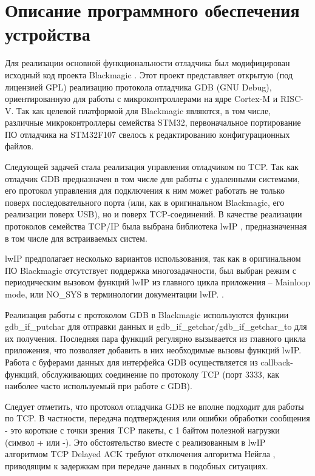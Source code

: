 \chapter{Описание программного обеспечения устройства}
\hspace{1cm} 

Для реализации основной функциональности отладчика был модифицирован исходный код проекта 
Blackmagic \cite{BlackMagic}. Этот проект представляет открытую (под лицензией GPL) реализацию протокола 
отладчика GDB (GNU Debug), ориентированную для работы с микроконтроллерами на ядре Cortex-M и RISC-V. 
Так как целевой платформой для Blackmagic являются, в том числе, различные микроконтроллеры 
семейства STM32, первоначальное портирование ПО отладчика на STM32F107 свелось к редактированию 
конфигурационных файлов.

Следующей задачей стала реализация управления отладчиком по TCP. Так как отладчик GDB предназначен 
в том числе для работы с удаленными системами, его протокол управления для подключения к ним может
работать не только поверх последовательного порта (или, как в оригинальном Blackmagic, его реализации
поверх USB), но и поверх TCP-соединений. В качестве реализации протоколов семейства TCP/IP была 
выбрана библиотека lwIP \cite{LWIP:doc}, предназначенная в том числе для встраиваемых систем.

lwIP предполагает несколько вариантов использования, так как в оригинальном ПО Blackmagic 
отсутствует поддержка многозадачности, был выбран режим с периодическим вызовом функций lwIP 
из главного цикла приложения -- Mainloop mode, или NO\_SYS в терминологии документации 
lwIP. \cite{LWIP:doc}.

Реализация работы с протоколом GDB в Blackmagic используются функции gdb\_if\_putchar для отправки 
данных и gdb\_if\_getchar/gdb\_if\_getchar\_to для их получения. Последняя пара функций регулярно 
вызывается из главного цикла приложения, что позволяет добавить в них необходимые вызовы функций lwIP. 
Работа с буферами данных для интерфейса GDB осуществляется из callback-функций, обслуживающих 
соединение по протоколу TCP (порт 3333, как наиболее часто используемый при работе с GDB).

Следует отметить, что протокол отладчика GDB \cite{GDB} не вполне подходит для работы по TCP. 
В частности, передача подтверждения или ошибки обработки сообщения 
- это короткие с точки зрения TCP пакеты, с 1 байтом полезной нагрузки (символ + или -). 
Это обстоятельство вместе с реализованным в lwIP алгоритмом TCP Delayed ACK требуют отключения 
алгоритма Нейгла \cite{RFC Neiqel}, приводящим к задержкам при передаче данных в подобных ситуациях.

